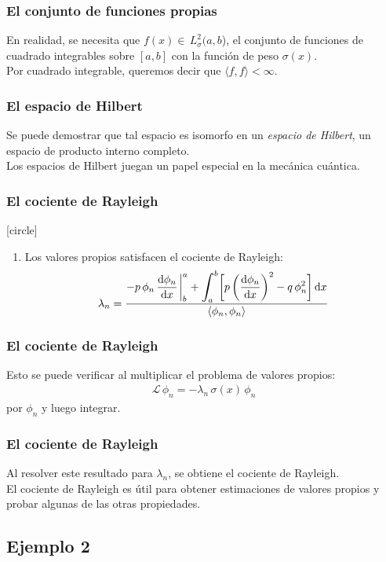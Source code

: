 \documentclass[12pt]{beamer}
\begin{document}
\begin{frame}
\frametitle{El conjunto de funciones propias}
En realidad, se necesita que $f (x) \in \, L_{\sigma}^{2} (a, b$), el conjunto de funciones de cuadrado integrables sobre $[a, b]$ con la función de peso $\sigma (x)$.
\\
\bigskip
\pause
Por cuadrado integrable, queremos decir que $\langle f,  f \rangle < \infty$.
\end{frame}
\begin{frame}
\frametitle{El espacio de Hilbert}
Se puede demostrar que tal espacio es isomorfo en un \emph{espacio de Hilbert}, un espacio de producto interno completo.
\\
\bigskip
\pause
Los espacios de Hilbert juegan un papel especial en la mecánica cuántica.
\end{frame}
\begin{frame}
\frametitle{El cociente de Rayleigh}
[circle]
\begin{enumerate}[<+->]
\conti
\item Los valores propios satisfacen el cociente de Rayleigh:
\pause
\begin{align*}
\lambda_{n} = \dfrac{- p \, \phi_{n} \, \displaystyle \dv{\phi_{n}}{x} \eval_{b}^{a} + \scaleint{6ex}_{\bs a}^{b} \bigg[ p \left( \dv{\phi_{n}}{x} \right)^{2} - q \, \phi_{n}^{2} \bigg] \dd{x}}{\langle  \phi_{n}, \phi_{n} \rangle} 
\end{align*}
\seti
\end{enumerate}
\end{frame}
\begin{frame}
\frametitle{El cociente de Rayleigh}
Esto se puede verificar al multiplicar el problema de valores propios:
\pause
\begin{align*}
\mathcal{L} \, \phi_{n} = - \lambda_{n} \, \sigma(x) \, \phi_{n}
\end{align*}
por $\phi_{n}$ y luego integrar.
\end{frame}
\begin{frame}
\frametitle{El cociente de Rayleigh}
Al resolver este resultado para $\lambda_{n}$, se obtiene el cociente de Rayleigh.
\\
\bigskip
\pause
El cociente de Rayleigh es útil para obtener estimaciones de valores propios y probar algunas de las otras propiedades.
\end{frame}

\subsection*{Ejemplo 2}
\end{document}
